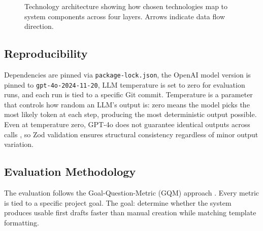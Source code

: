 \begin{figure}[H]
\caption{Technology architecture showing how chosen technologies map to system components across four layers. Arrows indicate data flow direction.}
\label{fig:tech-architecture}
\end{figure}

\subsection{Reproducibility}

Dependencies are pinned via \texttt{package-lock.json}, the OpenAI model version is pinned to \texttt{gpt-4o-2024-11-20}, LLM temperature is set to zero for evaluation runs, and each run is tied to a specific Git commit. Temperature is a parameter that controls how random an LLM's output is: zero means the model picks the most likely token at each step, producing the most deterministic output possible. Even at temperature zero, GPT-4o does not guarantee identical outputs across calls \parencite{runeson2012}, so Zod validation ensures structural consistency regardless of minor output variation.

\subsection{Evaluation Methodology}

The evaluation follows the Goal-Question-Metric (GQM) approach \parencite{basili1994}. Every metric is tied to a specific project goal. The goal: determine whether the system produces usable first drafts faster than manual creation while matching template formatting.

